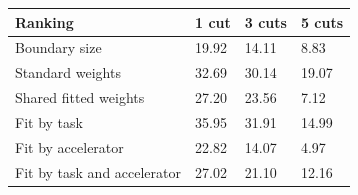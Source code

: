 \begin{tabular}{@{}llll@{}}
\toprule
Ranking & 1 cut & 3 cuts & 5 cuts \\
\midrule
Boundary size & 19.92 & 14.11 & 8.83 \\
Standard weights & 32.69 & 30.14 & 19.07 \\
Shared fitted weights & 27.20 & 23.56 & 7.12 \\
Fit by task & 35.95 & 31.91 & 14.99 \\
Fit by accelerator & 22.82 & 14.07 & 4.97 \\
Fit by task and accelerator & 27.02 & 21.10 & 12.16 \\
\bottomrule
\end{tabular}
